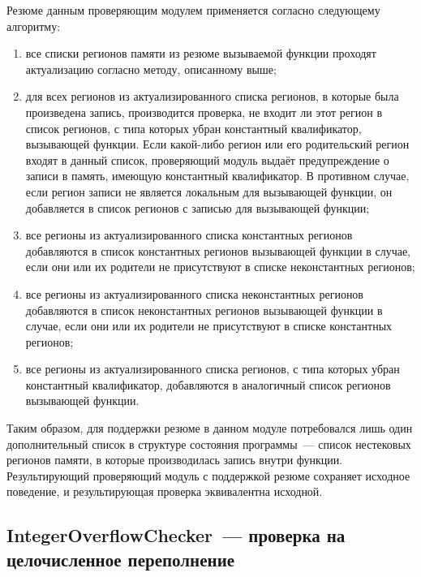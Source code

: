 Резюме данным проверяющим модулем применяется согласно следующему алгоритму:

\begin{enumerate}
 \item все списки регионов памяти из резюме вызываемой функции проходят актуализацию согласно методу, описанному выше;
 \item для всех регионов из актуализированного списка регионов, в которые была произведена запись, производится проверка, не входит ли этот регион в список регионов, с типа которых убран константный квалификатор, вызывающей функции. Если какой-либо регион или его родительский регион входят в данный список, проверяющий модуль выдаёт предупреждение о записи в память, имеющую константный квалификатор. В противном случае, если регион записи не является локальным для вызывающей функции, он добавляется в список регионов с записью для вызывающей функции;
 \item все регионы из актуализированного списка константных регионов добавляются в список константных регионов вызывающей функции в случае, если они или их родители не присутствуют в списке неконстантных регионов;
 \item все регионы из актуализированного списка неконстантных регионов добавляются в список неконстантных регионов вызывающей функции в случае, если они или их родители не присутствуют в списке константных регионов;
 \item все регионы из актуализированного списка регионов, с типа которых убран константный квалификатор, добавляются в аналогичный список регионов вызывающей функции.
\end{enumerate}

Таким образом, для поддержки резюме в данном модуле потребовался лишь один дополнительный список в структуре состояния программы~--- список нестековых регионов памяти, в которые производилась запись внутри функции. Результирующий проверяющий модуль с поддержкой резюме сохраняет исходное поведение, и результирующая проверка эквивалентна исходной.

\subsection{IntegerOverflowChecker~--- проверка на целочисленное переполнение}

